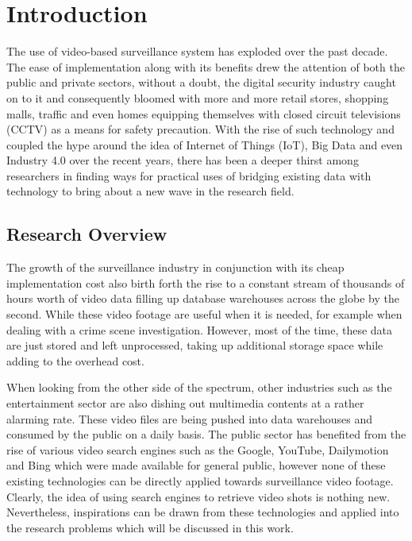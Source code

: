 \chapter{Introduction}
The use of video-based surveillance system has exploded over the past decade. The ease of implementation along with its benefits drew the attention of both the public and private sectors, without a doubt, the digital security industry caught on to it and consequently bloomed with more and more retail stores, shopping malls, traffic and even homes equipping themselves with closed circuit televisions (CCTV) as a means for safety precaution. With the rise of such technology and coupled the hype around the idea of Internet of Things (IoT), Big Data and even Industry 4.0 over the recent years, there has been a deeper thirst among researchers in finding ways for practical uses of bridging existing data with technology to bring about a new wave in the research field.

\section{Research Overview}
\label{section:introduction}

The growth of the surveillance industry in conjunction with its cheap implementation cost also birth forth the rise to a constant stream of thousands of hours worth of video data filling up database warehouses across the globe by the second. While these video footage are useful when it is needed, for example when dealing with a crime scene investigation. However, most of the time, these data are just stored and left unprocessed, taking up additional storage space while adding to the overhead cost. 

When looking from the other side of the spectrum, other industries such as the entertainment sector are also dishing out multimedia contents at a rather alarming rate. These video files are being pushed into data warehouses and consumed by the public on a daily basis. The public sector has benefited from the rise of various video search engines such as the Google, YouTube, Dailymotion and Bing which were made available for general public, however none of these existing technologies can be directly applied towards surveillance video footage. Clearly, the idea of using search engines to retrieve video shots is nothing new. Nevertheless, inspirations can be drawn from these technologies and applied into the research problems which will be discussed in this work. 

